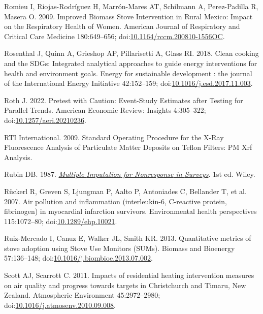 \documentclass[
  letterpaper,
  DIV=11,
  numbers=noendperiod]{scrartcl}
\newlength{\cslhangindent}
\newenvironment{CSLReferences}[2] %
 {\begin{list}{}{%
  \setlength{\itemindent}{0pt}
  \setlength{\leftmargin}{0pt}
  \setlength{\parsep}{0pt}
  \ifodd #1
   \setlength{\leftmargin}{\cslhangindent}
   \setlength{\itemindent}{-1\cslhangindent}
  \fi
  \setlength{\itemsep}{#2\baselineskip}}}
 {\end{list}}
\begin{document}
\begin{CSLReferences}{1}{1}
Romieu I, Riojas-Rodríguez H, Marrón-Mares AT, Schilmann A,
Perez-Padilla R, Masera O. 2009. Improved {Biomass Stove Intervention}
in {Rural Mexico}: {Impact} on the {Respiratory Health} of {Women}.
American Journal of Respiratory and Critical Care Medicine 180:649--656;
doi:\href{https://doi.org/10.1164/rccm.200810-1556OC}{10.1164/rccm.200810-1556OC}.

Rosenthal J, Quinn A, Grieshop AP, Pillarisetti A, Glass RI. 2018. Clean
cooking and the {SDGs}: {Integrated} analytical approaches to guide
energy interventions for health and environment goals. Energy for
sustainable development : the journal of the International Energy
Initiative 42:152--159;
doi:\href{https://doi.org/10.1016/j.esd.2017.11.003}{10.1016/j.esd.2017.11.003}.

Roth J. 2022. Pretest with {Caution}: {Event-Study Estimates} after
{Testing} for {Parallel Trends}. American Economic Review: Insights
4:305--322;
doi:\href{https://doi.org/10.1257/aeri.20210236}{10.1257/aeri.20210236}.

RTI International. 2009. Standard {Operating Procedure} for the {X-Ray
Fluorescence Analysis} of {Particulate Matter Deposits} on {Teflon
Filters}: {PM Xrf Analysis}.

Rubin DB. 1987.
\emph{\href{https://doi.org/10.1002/9780470316696}{Multiple {Imputation}
for {Nonresponse} in {Surveys}}}. 1st ed. Wiley.

Rückerl R, Greven S, Ljungman P, Aalto P, Antoniades C, Bellander T, et
al. 2007. Air pollution and inflammation (interleukin-6, {C-reactive}
protein, fibrinogen) in myocardial infarction survivors. Environmental
health perspectives 115:1072--80;
doi:\href{https://doi.org/10.1289/ehp.10021}{10.1289/ehp.10021}.

Ruiz-Mercado I, Canuz E, Walker JL, Smith KR. 2013. Quantitative metrics
of stove adoption using {Stove Use Monitors} ({SUMs}). Biomass and
Bioenergy 57:136--148;
doi:\href{https://doi.org/10.1016/j.biombioe.2013.07.002}{10.1016/j.biombioe.2013.07.002}.

Scott AJ, Scarrott C. 2011. Impacts of residential heating intervention
measures on air quality and progress towards targets in {Christchurch}
and {Timaru}, {New Zealand}. Atmospheric Environment 45:2972--2980;
doi:\href{https://doi.org/10.1016/j.atmosenv.2010.09.008}{10.1016/j.atmosenv.2010.09.008}.


\end{CSLReferences}
\end{document}
